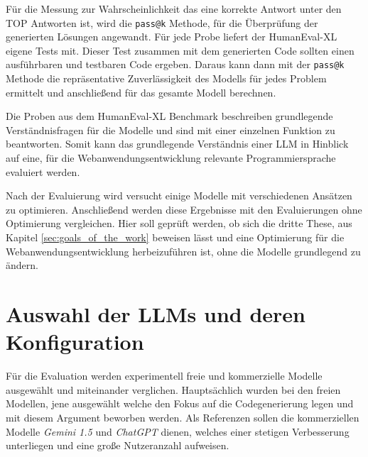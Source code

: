 Für die Messung zur \glqq Wahrscheinlichkeit das eine korrekte Antwort unter den TOP Antworten ist\grqq, wird die \texttt{pass@k} Methode, für die Überprüfung der generierten Lösungen angewandt. Für jede Probe liefert der HumanEval-XL eigene Tests mit. Dieser Test zusammen mit dem generierten Code sollten einen ausführbaren und testbaren Code ergeben. Daraus kann dann mit der \texttt{pass@k} Methode die repräsentative Zuverlässigkeit des Modells für jedes Problem ermittelt und anschließend für das gesamte Modell berechnen.\vspace{0.2cm}

Die Proben aus dem HumanEval-XL Benchmark beschreiben grundlegende Verständnisfragen für die Modelle und sind mit einer einzelnen Funktion zu beantworten. Somit kann das grundlegende Verständnis einer LLM in Hinblick auf eine, für die Webanwendungsentwicklung relevante Programmiersprache evaluiert werden.\vspace{0.2cm}

Nach der Evaluierung wird versucht einige Modelle mit verschiedenen Ansätzen zu optimieren. Anschließend werden diese Ergebnisse mit den Evaluierungen ohne Optimierung vergleichen. Hier soll geprüft werden, ob sich die dritte These, aus Kapitel \ref{sec:goals_of_the_work} beweisen lässt und eine Optimierung für die Webanwendungsentwicklung herbeizuführen ist, ohne die Modelle grundlegend zu ändern.



\section{Auswahl der LLMs und deren Konfiguration}\label{subsec:llm_selection}
Für die Evaluation werden experimentell freie und kommerzielle Modelle ausgewählt und miteinander verglichen. Hauptsächlich wurden bei den freien Modellen, jene ausgewählt welche den Fokus auf die Codegenerierung legen und mit diesem Argument beworben werden. Als Referenzen sollen die kommerziellen Modelle \textit{Gemini 1.5} und \textit{ChatGPT} dienen, welches einer stetigen Verbesserung unterliegen und eine große Nutzeranzahl aufweisen.\vspace{0.2cm}

